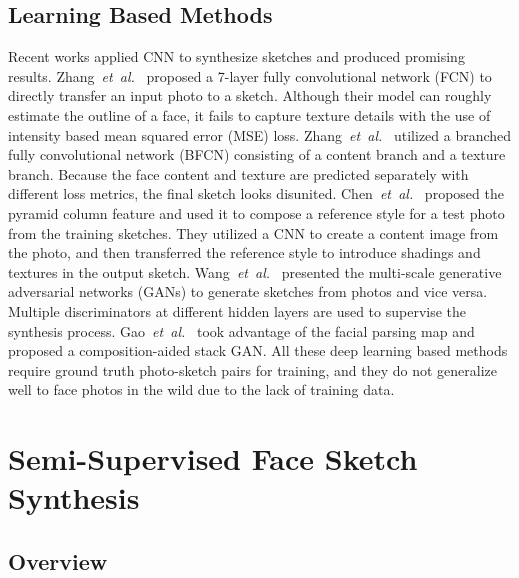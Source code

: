 \documentclass[runningheads]{llncs}
\def \etal {{\em et~al.}}
\begin{document}
\subsection{Learning Based Methods}

Recent works applied CNN to synthesize sketches and produced promising results. Zhang~\etal~\cite{zhang2015end} proposed a 7-layer fully convolutional network (FCN) to directly transfer an input photo to a sketch. Although their model can roughly estimate the outline of a face, it fails to capture texture details with the use of intensity based mean squared error (MSE) loss. Zhang~\etal~\cite{zhang2017content} utilized a branched fully convolutional network (BFCN) consisting of a content branch and a texture branch. Because the face content and texture are predicted separately with different loss metrics, the final sketch looks disunited. Chen~\etal~\cite{chen2017pcf} proposed the pyramid column feature and used it to compose a reference style for a test photo from the training sketches. They utilized a CNN to create a content image from the photo, and then transferred the reference style to introduce shadings and textures in the output sketch. Wang~\etal~\cite{wang2017data} presented the multi-scale generative adversarial networks (GANs) to generate sketches from photos and vice versa. Multiple discriminators at different hidden layers are used to supervise the synthesis process. Gao~\etal~\cite{Gao2017cagan} took advantage of the facial parsing map and proposed a composition-aided stack GAN. All these deep learning based methods require ground truth photo-sketch pairs for training, and they do not generalize well to face photos in the wild due to the lack of training data.

\section{Semi-Supervised Face Sketch Synthesis} \label{sec:semi}

\subsection{Overview}
\end{document}
